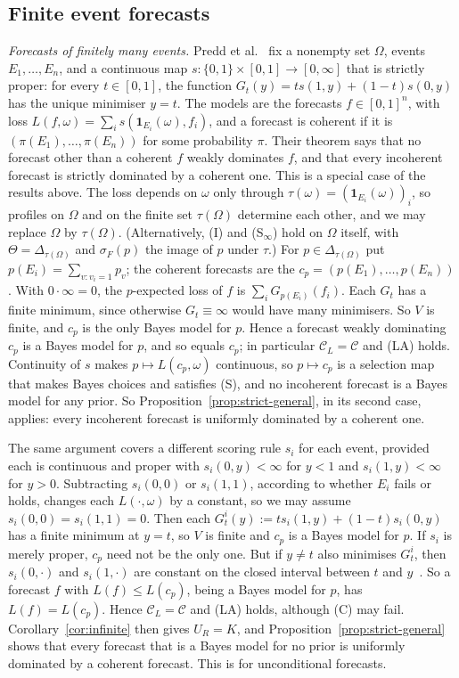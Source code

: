 \documentclass[11pt]{article}
\theoremstyle{definition}
\theoremstyle{remark}
\newcommand{\C}{\mathcal C}
\newcommand{\one}{\mathbf 1}
\begin{document}
\subsection{Finite event forecasts}\label{sec:forecasts}
\emph{Forecasts of finitely many events.} Predd et al.~\cite[Theorem~1]{Predd} fix a nonempty set $\Omega$, events $E_1,\dots,E_n$, and a continuous map $s:\{0,1\}\times[0,1]\to[0,\infty]$ that is strictly proper: for every $t\in[0,1]$, the function $G_t(y)=ts(1,y)+(1-t)s(0,y)$ has the unique minimiser $y=t$. The models are the forecasts $f\in[0,1]^n$, with loss $L(f,\omega)=\sum_is(\one_{E_i}(\omega),f_i)$, and a forecast is coherent if it is $(\pi(E_1),\dots,\pi(E_n))$ for some probability $\pi$. Their theorem says that no forecast other than a coherent $f$ weakly dominates $f$, and that every incoherent forecast is strictly dominated by a coherent one. This is a special case of the results above. The loss depends on $\omega$ only through $\tau(\omega)=(\one_{E_i}(\omega))_i$, so profiles on $\Omega$ and on the finite set $\tau(\Omega)$ determine each other, and we may replace $\Omega$ by $\tau(\Omega)$. (Alternatively, (I) and (S$_\infty$) hold on $\Omega$ itself, with $\Theta=\Delta_{\tau(\Omega)}$ and $\sigma_F(p)$ the image of $p$ under $\tau$.) For $p\in\Delta_{\tau(\Omega)}$ put $p(E_i)=\sum_{v:v_i=1}p_v$; the coherent forecasts are the $c_p=(p(E_1),\dots,p(E_n))$. With $0\cdot\infty=0$, the $p$-expected loss of $f$ is $\sum_iG_{p(E_i)}(f_i)$. Each $G_t$ has a finite minimum, since otherwise $G_t\equiv\infty$ would have many minimisers. So $V$ is finite, and $c_p$ is the only Bayes model for $p$. Hence a forecast weakly dominating $c_p$ is a Bayes model for $p$, and so equals $c_p$; in particular $\C_L=\C$ and (LA) holds. Continuity of $s$ makes $p\mapsto L(c_p,\omega)$ continuous, so $p\mapsto c_p$ is a selection map that makes Bayes choices and satisfies (S), and no incoherent forecast is a Bayes model for any prior. So Proposition~\ref{prop:strict-general}, in its second case, applies: every incoherent forecast is uniformly dominated by a coherent one.

The same argument covers a different scoring rule $s_i$ for each event, provided each is continuous and proper with $s_i(0,y)<\infty$ for $y<1$ and $s_i(1,y)<\infty$ for $y>0$. Subtracting $s_i(0,0)$ or $s_i(1,1)$, according to whether $E_i$ fails or holds, changes each $L(\cdot,\omega)$ by a constant, so we may assume $s_i(0,0)=s_i(1,1)=0$. Then each $G^i_t(y):=ts_i(1,y)+(1-t)s_i(0,y)$ has a finite minimum at $y=t$, so $V$ is finite and $c_p$ is a Bayes model for $p$. If $s_i$ is merely proper, $c_p$ need not be the only one. But if $y\ne t$ also minimises $G^i_t$, then $s_i(0,\cdot)$ and $s_i(1,\cdot)$ are constant on the closed interval between $t$ and $y$~\cite[Lemma~5]{SSK09}. So a forecast $f$ with $L(f)\le L(c_p)$, being a Bayes model for $p$, has $L(f)=L(c_p)$. Hence $\C_L=\C$ and (LA) holds, although (C) may fail. Corollary~\ref{cor:infinite} then gives $U_R=K$, and Proposition~\ref{prop:strict-general} shows that every forecast that is a Bayes model for no prior is uniformly dominated by a coherent forecast. This is \cite[Theorem~2, Conclusion~3]{SSK09} for unconditional forecasts.
\end{document}
